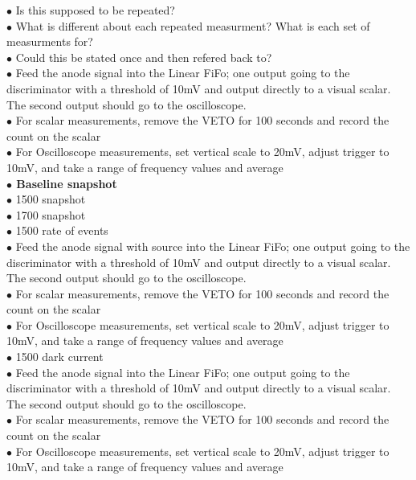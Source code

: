 {\color{blue}$\bullet$ Is this supposed to be repeated?}\\
{\color{blue}$\bullet$ What is different about each repeated measurment? What is each set of measurments for?}\\
{\color{blue}$\bullet$ Could this be stated once and then refered back to?}\\
$\bullet$ Feed the anode signal into the Linear FiFo; one output going to the discriminator with a threshold of 10mV and output directly to a visual scalar. The second output should go to the oscilloscope.\\
$\bullet$ For scalar measurements, remove the VETO for 100 seconds and record the count on the scalar\\
$\bullet$ For Oscilloscope measurements, set vertical scale to 20mV, adjust trigger to 10mV, and take a range of frequency values and average\\

\textbf{\color[rgb]{1,0.5,0}$\bullet$ Baseline snapshot}\\
$\bullet$ 1500 snapshot\\
$\bullet$ 1700 snapshot\\
$\bullet$ 1500 rate of events\\
$\bullet$ Feed the anode signal with source into the Linear FiFo; one output going to the discriminator with a threshold of 10mV and output directly to a visual scalar. The second output should go to the oscilloscope.\\
$\bullet$ For scalar measurements, remove the VETO for 100 seconds and record the count on the scalar\\
$\bullet$ For Oscilloscope measurements, set vertical scale to 20mV, adjust trigger to 10mV, and take a range of frequency values and average\\
$\bullet$ 1500 dark current\\
$\bullet$ Feed the anode signal into the Linear FiFo; one output going to the discriminator with a threshold of 10mV and output directly to a visual scalar. The second output should go to the oscilloscope.\\
$\bullet$ For scalar measurements, remove the VETO for 100 seconds and record the count on the scalar\\
$\bullet$ For Oscilloscope measurements, set vertical scale to 20mV, adjust trigger to 10mV, and take a range of frequency values and average\\

